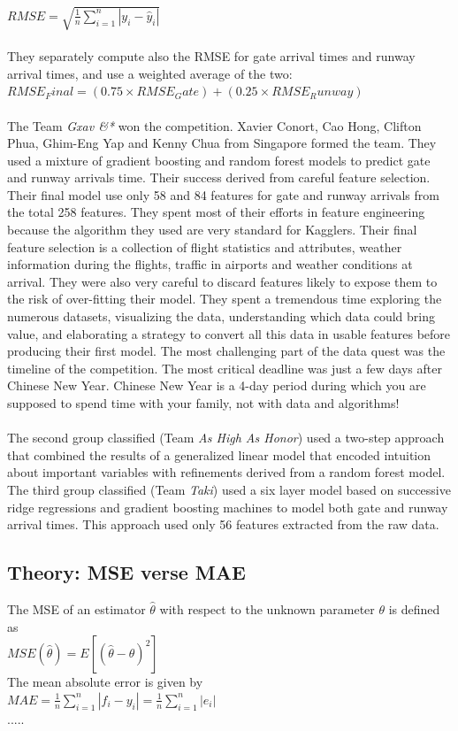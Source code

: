 \documentclass{vldb}
\begin{document}
		$RMSE=\sqrt{\frac{1}{n}\sum_{i=1}^n \left | y_i - \hat{y}_i \right |} $\\\\
		They separately compute also the RMSE for gate arrival times and runway arrival times, and use a weighted average of the two:\\
		$RMSE_Final=(0.75×RMSE_Gate)+(0.25×RMSE_Runway)$
		\\\\
		The Team \textit{Gxav \&*} won the competition. Xavier Conort, Cao Hong, Clifton Phua, Ghim-Eng Yap and Kenny Chua from Singapore formed the team. They used a mixture of gradient boosting and random forest models to predict gate and runway arrivals time. Their success derived from careful feature selection. Their final model use only 58 and 84 features for gate and runway arrivals from the total 258 features. They spent most of their efforts in feature engineering because the algorithm they used are very standard for Kagglers. Their final feature selection is a collection of flight statistics and attributes, weather information during the flights, traffic in airports and weather conditions at arrival. They were also very careful to discard features likely to expose them to the risk of over-fitting their model. They spent a tremendous time exploring the numerous datasets, visualizing the data, understanding which data could bring value, and elaborating a strategy to convert all this data in usable features before producing their first model. The most challenging part of the data quest was the timeline of the competition. The most critical deadline was just a few days after Chinese New Year. Chinese New Year is a 4-day period during which you are supposed to spend time with your family, not with data and algorithms!\\\\
		The second group classified (Team \textit{As High As Honor}) used a two-step approach that combined the results of a generalized linear model that encoded intuition about important variables with refinements derived from a random forest model. The third group classified (Team \textit{Taki}) used a six layer model based on successive ridge regressions and gradient boosting machines to model both gate and runway arrival times. This approach used only 56 features extracted from the raw data.
		
	
	
	\subsection{Theory: MSE verse MAE}
		The MSE of an estimator $\hat{\theta}$ with respect to the unknown parameter $\theta$ is defined as\\ $MSE(\hat{\theta})=E[(\hat{\theta}-\theta)^2]$\\
		The mean absolute error is given by\\ $MAE=\frac{1}{n}\sum_{i=1}^n \left | f_i - y_i \right | = \frac{1}{n}\sum_{i=1}^n \left | e_i \right |$ \\ .....
\end{document}

